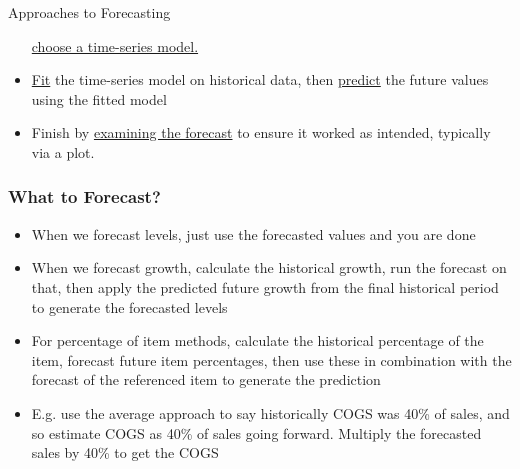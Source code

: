 \documentclass[handout, 11pt]{beamer}
\begin{document}
\begin{section}{Approaches to Forecasting}
\begin{frame}
\begin{itemize}
\underline{choose a time-series model.}
\vfill
\item \underline{Fit}
the time-series model on historical data, then
\underline{predict}
the future values using the fitted model
\vfill
\item Finish by
\underline{examining the forecast}
to ensure it worked as intended, 
typically via a plot.
\end{itemize}
\end{frame}
\begin{frame}
\frametitle{What to Forecast?}
\begin{itemize}
\item When we forecast levels, just use the forecasted values and you are done
\vfill
\item When we forecast growth, calculate the historical growth, run the forecast on that, then apply the predicted future growth from the final historical period to generate the forecasted levels
\vfill
\item For percentage of item methods, calculate the historical percentage of the item, forecast future item percentages, then use these in combination with the forecast of the referenced item to generate the prediction
\vfill
\item E.g. use the average approach to say historically COGS was 40\% of sales, and so estimate COGS as 40\% of sales going forward. Multiply the forecasted sales by 40\% to get the COGS
\end{itemize}
\end{frame}
\end{section}
\end{document}
